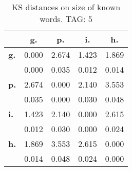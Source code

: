 \begin{table}[h!]
\begin{center}
\begin{tabular}{| l || c | c | c | c |}\hline
 & {\bf g.} & {\bf p.} & {\bf i.} & {\bf h.} \\\hline\hline
{\bf g.} & 0.000 & 2.674 & 1.423 & 1.869 \\
{\bf } & 0.000 & 0.035 & 0.012 & 0.014 \\\hline
{\bf p.} & 2.674 & 0.000 & 2.140 & 3.553 \\
{\bf } & 0.035 & 0.000 & 0.030 & 0.048 \\\hline
{\bf i.} & 1.423 & 2.140 & 0.000 & 2.615 \\
{\bf } & 0.012 & 0.030 & 0.000 & 0.024 \\\hline
{\bf h.} & 1.869 & 3.553 & 2.615 & 0.000 \\
{\bf } & 0.014 & 0.048 & 0.024 & 0.000 \\\hline
\end{tabular}
\caption{KS distances on size of known words. TAG: 5}
\end{center}
\end{table}